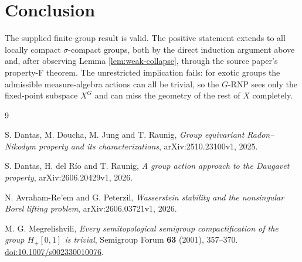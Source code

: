 \documentclass[11pt]{article}
\theoremstyle{remark}
\begin{document}
\section{Conclusion}

The supplied finite-group result is valid.  The positive statement extends
to all locally compact $\sigma$-compact groups, both by the direct induction
argument above and, after observing Lemma \ref{lem:weak-collapse}, through
the source paper's property-F theorem.  The unrestricted implication fails:
for exotic groups the admissible measure-algebra actions can all be trivial,
so the $G$-RNP sees only the fixed-point subspace $X^G$ and can miss the
geometry of the rest of $X$ completely.

\begin{thebibliography}{9}

S. Dantas, M. Doucha, M. Jung and T. Raunig,
\emph{Group equivariant Radon--Nikodym property and its characterizations},
arXiv:2510.23100v1, 2025.

S. Dantas, H. del R\'io and T. Raunig,
\emph{A group action approach to the Daugavet property},
arXiv:2606.20429v1, 2026.

N. Avraham-Re'em and G. Peterzil,
\emph{Wasserstein stability and the nonsingular Borel lifting problem},
arXiv:2606.03721v1, 2026.

M. G. Megrelishvili,
\emph{Every semitopological semigroup compactification of the group
$H_+[0,1]$ is trivial},
Semigroup Forum \textbf{63} (2001), 357--370.
\href{https://doi.org/10.1007/s002330010076}{doi:10.1007/s002330010076}.

\end{thebibliography}
\end{document}
